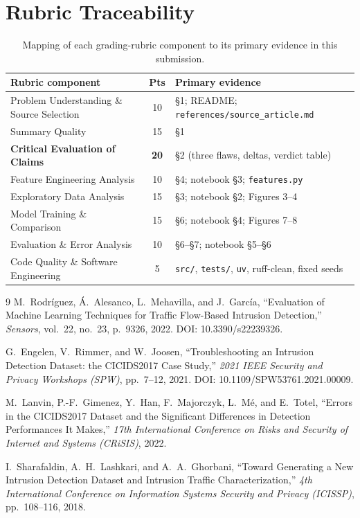 \documentclass[11pt,a4paper]{article}
\begin{document}
\section{Rubric Traceability}
\begin{table}[H]
\centering\small
\begin{tabular}{l c l}
\toprule
\textbf{Rubric component} & \textbf{Pts} & \textbf{Primary evidence}\\
\midrule
Problem Understanding \& Source Selection & 10 & \S1; README; \texttt{references/source\_article.md}\\
Summary Quality & 15 & \S1\\
\textbf{Critical Evaluation of Claims} & \textbf{20} & \S2 (three flaws, deltas, verdict table)\\
Feature Engineering Analysis & 10 & \S4; notebook \S3; \texttt{features.py}\\
Exploratory Data Analysis & 15 & \S3; notebook \S2; Figures 3--4\\
Model Training \& Comparison & 15 & \S6; notebook \S4; Figures 7--8\\
Evaluation \& Error Analysis & 10 & \S6--\S7; notebook \S5--\S6\\
Code Quality \& Software Engineering & 5 & \texttt{src/}, \texttt{tests/}, \texttt{uv}, ruff-clean, fixed seeds\\
\bottomrule
\end{tabular}
\caption{Mapping of each grading-rubric component to its primary evidence in this submission.}
\end{table}

\begin{thebibliography}{9}
M.~Rodr\'iguez, \'A.~Alesanco, L.~Mehavilla, and J.~Garc\'ia,
``Evaluation of Machine Learning Techniques for Traffic Flow-Based Intrusion Detection,''
\emph{Sensors}, vol.~22, no.~23, p.~9326, 2022. DOI: 10.3390/s22239326.

G.~Engelen, V.~Rimmer, and W.~Joosen,
``Troubleshooting an Intrusion Detection Dataset: the CICIDS2017 Case Study,''
\emph{2021 IEEE Security and Privacy Workshops (SPW)}, pp.~7--12, 2021.
DOI: 10.1109/SPW53761.2021.00009.

M.~Lanvin, P.-F.~Gimenez, Y.~Han, F.~Majorczyk, L.~M\'e, and E.~Totel,
``Errors in the CICIDS2017 Dataset and the Significant Differences in Detection Performances
It Makes,'' \emph{17th International Conference on Risks and Security of Internet and Systems
(CRiSIS)}, 2022.

I.~Sharafaldin, A.~H.~Lashkari, and A.~A.~Ghorbani,
``Toward Generating a New Intrusion Detection Dataset and Intrusion Traffic
Characterization,'' \emph{4th International Conference on Information Systems Security and
Privacy (ICISSP)}, pp.~108--116, 2018.
\end{thebibliography}
\end{document}
